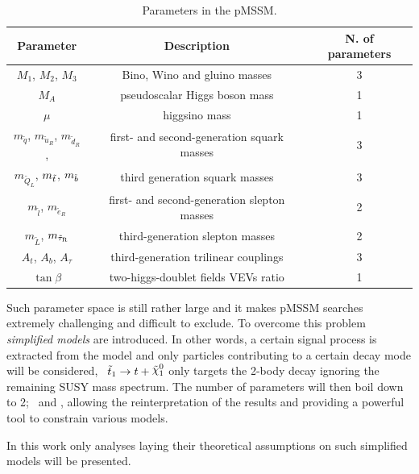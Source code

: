 				\begin{table}[!htb]\centering\caption{Parameters in the pMSSM.}
					\begin{tabular}{c|c|c}
					\hline
					\textbf{Parameter} & \textbf{Description} & \textbf{N. of parameters} \\ \hline \hline

					$M_1$, $M_2$, $M_3$ & Bino, Wino and gluino masses & 3 \\ \hline

					$M_{A}$	& pseudoscalar Higgs boson mass	& 1 \\\hline
					$\mu$  & higgsino mass & 1 \\\hline

					$m_{\tilde{q}}$, $m_{\tilde{u}_R}$, $m_{\tilde{d}_R}$, & first- and second-generation squark masses & 3 \\
					$m_{\tilde{Q}_L}$, $m_{\tilde{t}}$, $m_{\tilde{b}}$ & third generation squark masses	&  3 \\\hline

					$m_{\tilde{l}}$, $m_{\tilde{e}_R}$ & first- and second-generation slepton masses	 & 2 \\
					$m_{\tilde{L}}$, $m_{\tilde{\tau}_{\mathrm{R}}}$ & third-generation slepton masses	& 2 \\\hline

					$A_t$, $A_b$, $A_{\tau}$ & third-generation trilinear couplings	& 3 \\\hline

					$\tan \beta$ & two-higgs-doublet fields VEVs ratio & 1 \\ 
					\hline
					\end{tabular}
				\label{tab:MSSM_mainFreePar} 
				\end{table}

				\noindent Such parameter space is still rather large and it makes pMSSM searches extremely challenging and difficult to exclude. To overcome this problem \textit{simplified models} are introduced. In other words, a certain signal process is extracted from the model and only particles contributing to a certain decay mode will be considered, \eg\ $\stopone \ra t + \ninoone$ only targets the 2-body decay ignoring the remaining SUSY mass spectrum. The number of parameters will then boil down to 2; \mstop\ and \mLSP, allowing the reinterpretation of the results and providing a powerful tool to constrain various models. 

				In this work only analyses laying their theoretical assumptions on such simplified models will be presented. 

